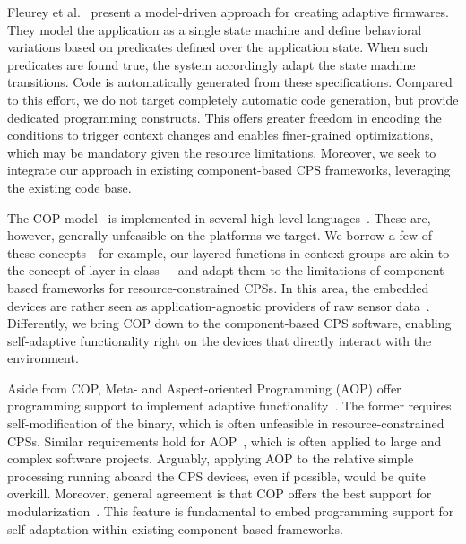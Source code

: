 Fleurey et al.~\cite{Fleureya-adaptive-firmwares11} present a
model-driven approach for creating adaptive firmwares. They model the
application as a single state machine and define behavioral variations
based on predicates defined over the application state. When such
predicates are found true, the system accordingly adapt the state
machine transitions. Code is automatically generated from these
specifications. Compared to this effort, we do not target completely
automatic code generation, but provide dedicated programming
constructs. This offers greater freedom in encoding the conditions to
trigger context changes and enables finer-grained optimizations, which
may be mandatory given the resource limitations. Moreover, we seek to
integrate our approach in existing component-based CPS frameworks,
leveraging the existing code base.

The COP model~\cite{Hirschfeld08} is implemented in several high-level
languages~\cite{Bardram05,Ghezzi10,Kamina11,Salvaneschi12,Sehic11}. These
are, however, generally unfeasible on the platforms we target. We
borrow a few of these concepts---for example, our layered functions in
context groups are akin to the concept of
layer-in-class~\cite{Salvaneschi12}---and adapt them to the
limitations of component-based frameworks for resource-constrained
CPSs. In this area, the embedded devices are rather seen as
application-agnostic providers of raw sensor
data~\cite{Sehic11}. Differently, we bring COP down to the
component-based CPS software, enabling self-adaptive functionality
right on the devices that directly interact with the environment.

Aside from COP, Meta- and Aspect-oriented Programming (AOP) offer
programming support to implement adaptive
functionality~\cite{SalvaneschiTBP}. The former requires
self-modification of the binary, which is often unfeasible in
resource-constrained CPSs. Similar requirements hold for
AOP~\cite{Kiczales:AOP:97}, which is often applied to large and
complex software projects. Arguably, applying AOP to the relative
simple processing running aboard the CPS devices, even if possible,
would be quite overkill. Moreover, general agreement is that COP
offers the best support for modularization~\cite{SalvaneschiTBP}. This
feature is fundamental to embed programming support for
self-adaptation within existing component-based frameworks.



